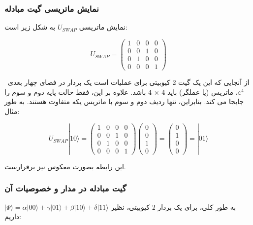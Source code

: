 \documentclass{book}
\begin{document}
\subsubsection{نمایش ماتریسی گیت مبادله}
نمایش ماتریسی $U_{S W A P}$ به شکل زیر است:
\begin{center}
	$$U_{S W A P}=\left(\begin{array}{llll}
		1 & 0 & 0 & 0 \\
		0 & 0 & 1 & 0 \\
		0 & 1 & 0 & 0 \\
		0 & 0 & 0 & 1
	\end{array}\right)$$
\end{center}
\
 از آنجایی که این یک گیت 2 کیوبیتی برای عملیات است یک بردار در فضای چهار بعدی $\mathbb{c}^4$، ماتریس (یا عملگر) باید 4 × 4 باشد. علاوه بر این، فقط حالت پایه دوم و سوم را جابجا می کند. بنابراین، تنها ردیف دوم و سوم با ماتریس یکه متفاوت هستند. به طور مثال:
\begin{center}
	$$U_{S W A P}|10\rangle=\left(\begin{array}{llll}
		1 & 0 & 0 & 0 \\
		0 & 0 & 1 & 0 \\
		0 & 1 & 0 & 0 \\
		0 & 0 & 0 & 1
	\end{array}\right)\left(\begin{array}{l}
		0 \\
		0 \\
		1 \\
		0
	\end{array}\right)=\left(\begin{array}{l}
		0 \\
		1 \\
		0 \\
		0
	\end{array}\right)=|01\rangle$$
\end{center}
این رابطه‌ بصورت معکوس نیز برقرارست.

\subsubsection{گیت مبادله در مدار و خصوصیات آن}
به طور کلی، برای یک بردار 2 کیوبیتی، نظیر $\vert \Psi \rangle=\alpha|00\rangle+\gamma|01\rangle+\beta|10\rangle+\delta|11\rangle$ داریم:
\end{document}
